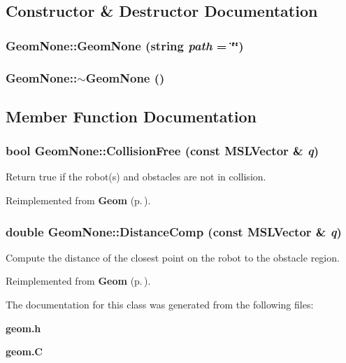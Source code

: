 \subsection{Constructor \& Destructor Documentation}
\subsubsection{\setlength{\rightskip}{0pt plus 5cm}Geom\-None::Geom\-None (string {\em path} = \char`\"{}\char`\"{})}\label{classGeomNone_a0}


\subsubsection{\setlength{\rightskip}{0pt plus 5cm}Geom\-None::$\sim$Geom\-None ()\hspace{0.3cm}{\tt  [inline, virtual]}}\label{classGeomNone_a1}




\subsection{Member Function Documentation}
\subsubsection{\setlength{\rightskip}{0pt plus 5cm}bool Geom\-None::Collision\-Free (const {\bf MSLVector} \& {\em q})\hspace{0.3cm}{\tt  [inline, virtual]}}\label{classGeomNone_a2}


Return true if the robot(s) and obstacles are not in collision.



Reimplemented from {\bf Geom} {\rm (p.\,\pageref{classGeom_a2})}.
\subsubsection{\setlength{\rightskip}{0pt plus 5cm}double Geom\-None::Distance\-Comp (const {\bf MSLVector} \& {\em q})\hspace{0.3cm}{\tt  [inline, virtual]}}\label{classGeomNone_a3}


Compute the distance of the closest point on the robot to the obstacle region.



Reimplemented from {\bf Geom} {\rm (p.\,\pageref{classGeom_a3})}.

The documentation for this class was generated from the following files:\begin{CompactItemize}
\item 
{\bf geom.h}\item 
{\bf geom.C}\end{CompactItemize}

